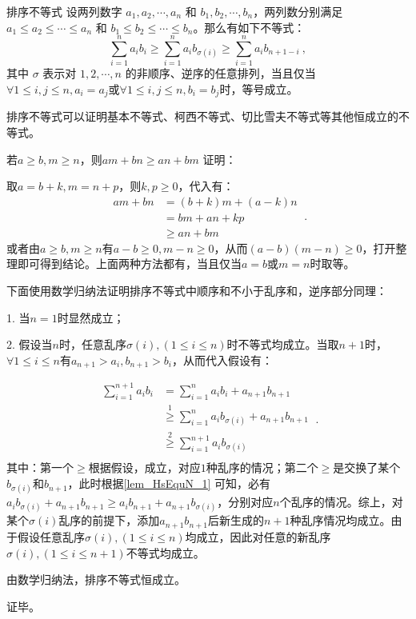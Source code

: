\begin{theorem}{排序不等式}
设两列数字 $a_1, a_2, \cdots, a_n$ 和 $b_1, b_2, \cdots, b_n$，两列数分别满足 $a_1 \leq a_2 \leq \cdots \leq a_n$ 和 $b_1 \leq b_2 \leq \cdots \leq b_n$。那么有如下不等式：
\begin{equation}
\sum_{i=1}^n a_i b_i \geq \sum_{i=1}^n a_i b_{\sigma(i)} \geq \sum_{i=1}^n a_i b_{n+1-i}~,
\end{equation}
其中 $\sigma$ 表示对 ${1, 2, \cdots, n}$ 的非顺序、逆序的任意排列，当且仅当$\forall 1\leq i,j\leq n,a_i=a_j$或$\forall 1\leq i,j\leq n,b_i=b_j$时，等号成立。
\end{theorem}

排序不等式可以证明基本不等式、柯西不等式、切比雪夫不等式等其他恒成立的不等式。

\begin{lemma}{若$a\geq b,m\geq n$，则$am+bn\geq an+bm$}\label{lem_HsEquN_1}
证明：

取$a=b+k,m=n+p$，则$k,p\geq0$，代入有：
\begin{equation}
\begin{split}
am+bn&= (b+k)m+(a-k)n \\ 
&= bm+an+kp \\
&\geq an+bm
\end{split}~.
\end{equation}
或者由$a\geq b,m\geq n$有$a-b\geq 0,m- n\geq0$，从而$(a-b)(m- n)\geq0$，打开整理即可得到结论。上面两种方法都有，当且仅当$a=b$或$m=n$时取等。
\end{lemma}

下面使用数学归纳法证明排序不等式中顺序和不小于乱序和，逆序部分同理：

1. 当$n=1$时显然成立；

2. 假设当$n$时，任意乱序$\sigma(i),(1\leq i\leq n)$时不等式均成立。当取$n+1$时，$\forall 1\leq i\leq n$有$a_{n+1}>a_i,b_{n+1}>b_i$，从而代入假设有：

\begin{equation}
\begin{split}
\sum_{i=1}^{n+1} a_i b_i&=\sum_{i=1}^n a_i b_i+a_{n+1}b_{n+1}\\
&\overset{\mathrm{1}}{\geq} \sum_{i=1}^n a_i b_{\sigma(i)} +a_{n+1}b_{n+1} \\ 
&\overset{\mathrm{2}}{\geq} \sum_{i=1}^{n+1} a_i b_{\sigma(i)} \\
\end{split}~.
\end{equation}
其中：第一个$\geq$根据假设，成立，对应$1$种乱序的情况；第二个$\geq$是交换了某个$b_{\sigma(i)}$和$b_{n+1}$，此时根据\autoref{lem_HsEquN_1} 可知，必有$a_i b_{\sigma(i)}+a_{n+1}b_{n+1}\geq a_ib_{n+1} +a_{n+1}b_{\sigma(i)}$，分别对应$n$个乱序的情况。综上，对某个$\sigma(i)$乱序的前提下，添加$a_{n+1}b_{n+1}$后新生成的$n+1$种乱序情况均成立。由于假设任意乱序$\sigma(i),(1\leq i\leq n)$均成立，因此对任意的新乱序$\sigma(i),(1\leq i\leq n+1)$不等式均成立。

由数学归纳法，排序不等式恒成立。

证毕。

